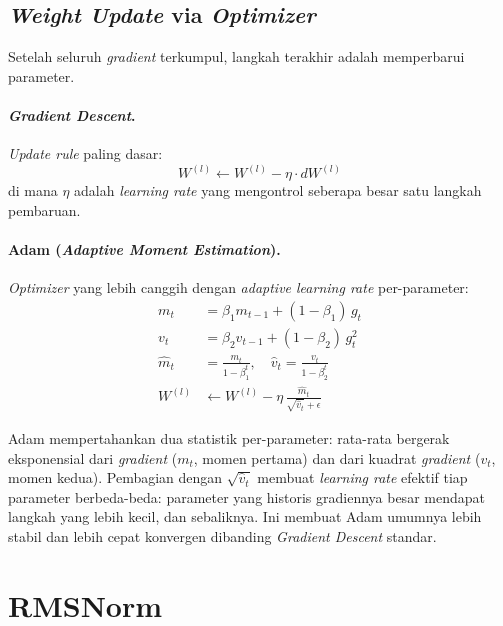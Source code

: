 \subsection{\textit{Weight Update} via \textit{Optimizer}}

Setelah seluruh \textit{gradient} terkumpul, langkah terakhir adalah memperbarui parameter.

\paragraph{\textit{Gradient Descent}.}
\textit{Update rule} paling dasar:
\begin{equation}
    W^{(l)} \leftarrow W^{(l)} - \eta \cdot dW^{(l)}
    \label{eq:gd-update}
\end{equation}
di mana $\eta$ adalah \textit{learning rate} yang mengontrol seberapa besar satu langkah pembaruan.

\paragraph{Adam (\textit{Adaptive Moment Estimation}).}
\textit{Optimizer} yang lebih canggih dengan \textit{adaptive learning rate} per-parameter:
\begin{align}
    m_t &= \beta_1 m_{t-1} + (1-\beta_1)\, g_t \\
    v_t &= \beta_2 v_{t-1} + (1-\beta_2)\, g_t^2 \\
    \hat{m}_t &= \frac{m_t}{1-\beta_1^t}, \quad \hat{v}_t = \frac{v_t}{1-\beta_2^t} \\
    W^{(l)} &\leftarrow W^{(l)} - \eta\, \frac{\hat{m}_t}{\sqrt{\hat{v}_t} + \epsilon}
\end{align}

Adam mempertahankan dua statistik per-parameter: rata-rata bergerak eksponensial dari \textit{gradient} ($m_t$, momen pertama) dan dari kuadrat \textit{gradient} ($v_t$, momen kedua). Pembagian dengan $\sqrt{\hat{v}_t}$ membuat \textit{learning rate} efektif tiap parameter berbeda-beda: parameter yang historis gradiennya besar mendapat langkah yang lebih kecil, dan sebaliknya. Ini membuat Adam umumnya lebih stabil dan lebih cepat konvergen dibanding \textit{Gradient Descent} standar.

\section{RMSNorm}

